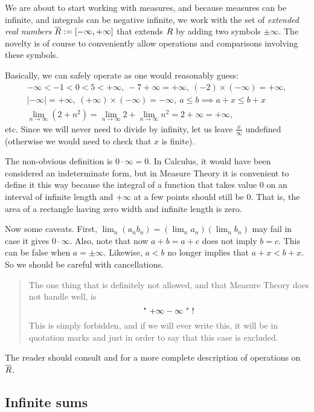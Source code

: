 \documentclass[
]{book}
\theoremstyle{definition}
\theoremstyle{remark}
\newcommand{\oR}{\overline{\R}}
\let\mathbb\relax %
\newcommand{\R}{\mathbb{R}}
\renewcommand*{\leq}{\leqslant}
\begin{document}
We are about to start working with measures, and because measures can be
infinite, and integrals can be negative infinite, we work with the set
of \emph{extended real numbers} \(\oR := [-\infty,+\infty]\) that extends \(\R\)
by adding two symbols \(\pm \infty\). The novelty is of course to
conveniently allow operations and comparisons involving these symbols.

Basically, we can safely operate as one would reasonably guess:
\[\begin{gathered}
-\infty < -1 < 0 < 5 < +\infty,
\
-7 +\infty = +\infty,
\
(-2) \times (-\infty) = +\infty,
\\
|-\infty| = +\infty,
\
(+\infty) \times (-\infty) = -\infty,
\
a \leq b \implies a+x \leq b+x
\\
\lim_{n\to\infty} (2+n^2)
=
\lim_{n\to\infty} 2
+
\lim_{n\to\infty} n^2
=
2 + \infty
=
+\infty,\end{gathered}\] etc. Since we will never need to divide by
infinity, let us leave \(\frac{x}{\infty}\) undefined (otherwise we would
need to check that \(x\) is finite).

The non-obvious definition is \(0 \cdot \infty = 0\). In Calculus, it
would have been considered an indeterminate form, but in Measure Theory
it is convenient to define it this way because the integral of a
function that takes value \(0\) on an interval of infinite length and
\(+\infty\) at a few points should still be \(0\). That is, the area of a
rectangle having zero width and infinite length is zero.

Now some caveats. First, \(\lim_n (a_n b_n) = (\lim_n a_n)(\lim_n b_n)\)
may fail in case it gives \(0 \cdot \infty\). Also, note that now
\(a+b = a+c\) does not imply \(b=c\). This can be false when \(a=\pm \infty\).
Likewise, \(a<b\) no longer implies that \(a+x < b+x\). So we should be
careful with cancellations.

\begin{quote}
The one thing that is definitely not allowed, and that Measure Theory
does not handle well, is \[\text{" $ +\infty -\infty $ " !}\] This is
simply forbidden, and if we will ever write this, it will be in
quotation marks and just in order to say that this case is excluded.
\end{quote}

The reader should consult \citep[ §§B.4--B.6]{Cohn13} and \citep[ p.~xi]{Tao11} for a
more complete description of operations on \(\oR\).

\hypertarget{infinite-sums}{%
\subsection{Infinite sums}\label{infinite-sums}}
\end{document}
